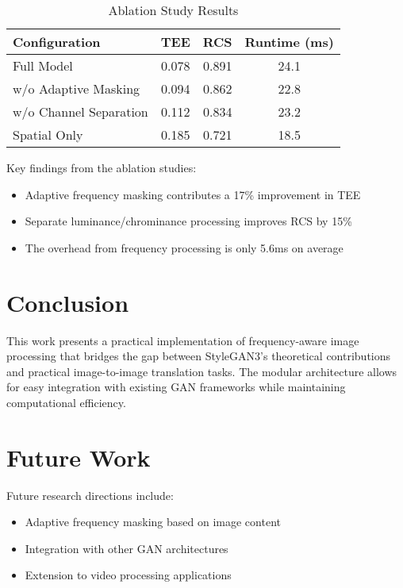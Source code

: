 \documentclass{article}
\begin{document}
\begin{table}[h]
\centering
\caption{Ablation Study Results}
\begin{tabular}{lccc}
\hline
Configuration & TEE & RCS & Runtime (ms) \\
\hline
Full Model & 0.078 & 0.891 & 24.1 \\
w/o Adaptive Masking & 0.094 & 0.862 & 22.8 \\
w/o Channel Separation & 0.112 & 0.834 & 23.2 \\
Spatial Only & 0.185 & 0.721 & 18.5 \\
\hline
\end{tabular}
\end{table}

Key findings from the ablation studies:
\begin{itemize}
\item Adaptive frequency masking contributes a 17\% improvement in TEE
\item Separate luminance/chrominance processing improves RCS by 15\%
\item The overhead from frequency processing is only 5.6ms on average
\end{itemize}

\section{Conclusion}
This work presents a practical implementation of frequency-aware image processing that bridges the gap between StyleGAN3's theoretical contributions and practical image-to-image translation tasks. The modular architecture allows for easy integration with existing GAN frameworks while maintaining computational efficiency.

\section{Future Work}
Future research directions include:
\begin{itemize}
\item Adaptive frequency masking based on image content
\item Integration with other GAN architectures
\item Extension to video processing applications
\end{itemize}
\end{document}

